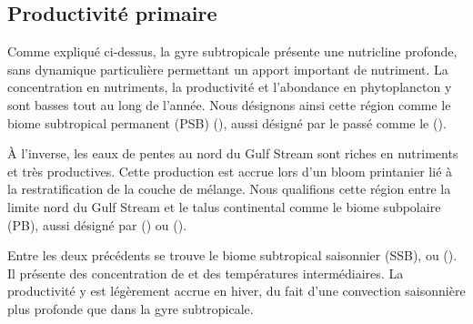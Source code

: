 \subsection{Productivité primaire}
\label{sec:gs-biologie}

Comme expliqué ci-dessus, la gyre subtropicale présente une nutricline profonde, sans dynamique particulière permettant un apport important de nutriment.
La concentration en nutriments, la productivité et l'abondance en phytoplancton y sont basses tout au long de l'année.
Nous désignons ainsi cette région comme le biome subtropical permanent (PSB) (), aussi désigné par le passé comme le  (\cite{sarmiento_2004}).

À l'inverse, les eaux de pentes au nord du Gulf Stream sont riches en nutriments et très productives.
Cette production est accrue lors d'un bloom printanier lié à la restratification de la couche de mélange.
Nous qualifions cette région entre la limite nord du Gulf Stream et le talus continental comme le biome subpolaire (PB), aussi désigné par  (\cite{sarmiento_2004}) ou  (\cite{bock_2022}).

Entre les deux précédents se trouve le biome subtropical saisonnier (SSB), ou  (\cite{sarmiento_2004}).
Il présente des concentration de  et des températures intermédiaires.
La productivité y est légèrement accrue en hiver, du fait d'une convection saisonnière plus profonde que dans la gyre subtropicale.

